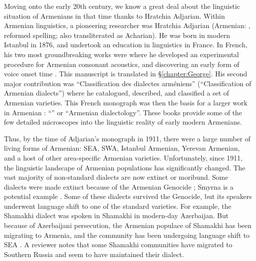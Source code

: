 Moving onto the early 20th century, we know a great deal about the linguistic situation of Armenians in that time  thanks to Hratchia Adjarian. Within Armenian linguistics, a pioneering researcher was Hratchia Adjarian (Armenian: , reformed spelling; also transliterated as Acharian). He was born in modern Istanbul in 1876, and undertook an education in linguistics in France. In French, his two most groundbreaking works were \citet{Adjarian-1899-ArmenianExplosives} where he developed an experimental procedure for Armenian consonant acoustics, and discovering an early form of voice onset time \citep{braun-2013-earlyCaseVOTAdjarian}.  This manuscript is translated in \S\ref{chapter:George}. His second major contribution was \citet{Adjarian-1909-ClassificationArmenianDialect} ``Classification des dialectes arméniens'' (``Classification of Armenian dialects'') where he catalogued, described, and classified a set of Armenian varieties. This French monograph was then the basis for a larger work in Armenian \citep{Adjarian-1911-DialectologyBook}: ``'' or ``Armenian dialectology''. These books provide some of the few detailed microscopes into the linguistic reality of early modern Armenians. 

Thus, by the time of Adjarian's monograph in 1911, there were a large number of living forms of Armenian: SEA, SWA, Istanbul Armenian, Yerevan Armenian, and a host of other area-specific Armenian varieties. Unfortunately, since 1911, the linguistic landscape of Armenian populations has significantly changed. The vast majority of non-standard dialects are now extinct or moribund. Some dialects were made extinct because of the Armenian Genocide \citep{Katvalyan-2015-GenocideArmenianLanguage}; Smyrna is a potential example \citep{Vaux-2012-ArmenianSmyrna}. Some of these dialects survived the Genocide, but its speakers underwent language shift to one of the standard varieties. For example, the Shamakhi dialect was spoken in Shamakhi in modern-day Azerbaijan. But because of Azerbaijani persecution, the Armenian populace of Shamakhi has been migrating to Armenia, and the community has been undergoing language shift to SEA \citep{Vlasyan-2019-Shamakhi}. A reviewer notes that some Shamakhi communities have migrated to Southern Russia and seem to have maintained their dialect.   

